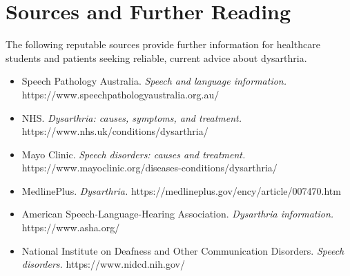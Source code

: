 \section*{Sources and Further Reading}
The following reputable sources provide further information for healthcare students and patients seeking reliable, current advice about dysarthria.
\begin{itemize}
    \item Speech Pathology Australia. \textit{Speech and language information.} https://www.speechpathologyaustralia.org.au/
    \item NHS. \textit{Dysarthria: causes, symptoms, and treatment.} https://www.nhs.uk/conditions/dysarthria/
    \item Mayo Clinic. \textit{Speech disorders: causes and treatment.} https://www.mayoclinic.org/diseases-conditions/dysarthria/
    \item MedlinePlus. \textit{Dysarthria.} https://medlineplus.gov/ency/article/007470.htm
    \item American Speech-Language-Hearing Association. \textit{Dysarthria information.} https://www.asha.org/
    \item National Institute on Deafness and Other Communication Disorders. \textit{Speech disorders.} https://www.nidcd.nih.gov/
\end{itemize}
